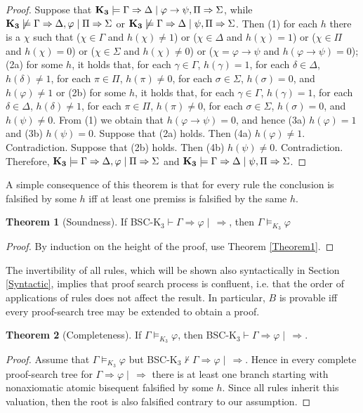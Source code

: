 \documentclass[11pt,a4paper,titlepage]{article}
\theoremstyle{definition}
\newtheorem{theorem}{\textbf{Theorem}}
\newcommand{\3}{\vspace{.3in}}
\newcommand{\2}{\vspace{.2in}}
\newcommand{\1}{\vspace{.1in}}
\newcommand{\5}{\vspace{.05in}}
\begin{document}
\begin{proof}
Suppose that ${\bf K_3}\models\Gamma\Rightarrow\Delta \mid \varphi\rightarrow\psi,\Pi\Rightarrow\Sigma$, while ${\bf K_3}\not\models\Gamma\Rightarrow\Delta,\varphi \mid \Pi\Rightarrow\Sigma$ or ${\bf K_3}\not\models\Gamma\Rightarrow\Delta \mid \psi,\Pi\Rightarrow\Sigma$. Then (1) for each $ h $ there is a $ \chi $ such that ($ \chi\in\Gamma $ and $ h(\chi)\not=1 $) or ($ \chi\in\Delta $ and $ h(\chi)=1 $) or ($ \chi\in\Pi $ and $ h(\chi)=0$) or ($ \chi\in\Sigma $ and $ h(\chi)\not=0 $) or ($ \chi=\varphi\rightarrow\psi $ and $ h(\varphi\rightarrow\psi)=0 $); (2a) for some $ h $, it holds that, for each $ \gamma\in\Gamma $, $h(\gamma)=1$, for each $ \delta\in\Delta $, $ h(\delta)\not=1 $, for each $ \pi\in\Pi $, $ h(\pi)\not=0 $, for each $ \sigma\in\Sigma $, $ h(\sigma)=0 $, and $ h(\varphi)\not=1 $ or (2b) for some $ h $, it holds that, for each $ \gamma\in\Gamma $, $h(\gamma)=1$, for each $ \delta\in\Delta $, $ h(\delta)\not=1 $, for each $ \pi\in\Pi $, $ h(\pi)\not=0 $, for each $ \sigma\in\Sigma $, $ h(\sigma)=0 $, and $ h(\psi)\not=0 $. From (1) we obtain that $ h(\varphi\rightarrow\psi)=0 $, and hence (3a) $ h(\varphi)=1 $ and (3b) $ h(\psi)=0 $. Suppose that (2a) holds. Then (4a) $ h(\varphi)\not=1 $. Contradiction. Suppose that (2b) holds. Then (4b) $ h(\psi)\not=0 $. Contradiction. Therefore, ${\bf K_3}\models\Gamma\Rightarrow\Delta,\varphi \mid \Pi\Rightarrow\Sigma$ and ${\bf K_3}\models\Gamma\Rightarrow\Delta \mid \psi,\Pi\Rightarrow\Sigma$.
\end{proof}


A simple consequence of this theorem is that for every rule the conclusion is falsified by some $h$ iff at least one premiss is falsified by the same $h$.

\begin{theorem}[Soundness]
	If BSC-K$_3 \vdash \Gamma\Rightarrow\varphi\mid\,\Rightarrow$, then $\Gamma\models_{K_3}\varphi$
\end{theorem}
\begin{proof}
By induction on the height of the proof, use Theorem \ref{Theorem1}.
\end{proof}

The invertibility of all rules, which will be shown also syntactically in Section \ref{Syntactic}, implies that proof search process is confluent, i.e. that the order of applications of rules does not affect the result. In particular, $B$ is provable iff every proof-search tree may be extended to obtain a proof.


\begin{theorem}[Completeness]
	If $\Gamma\models_{K_3}\varphi$, then
	BSC-K$_3 \vdash \Gamma\Rightarrow\varphi\mid\,\Rightarrow$.
\end{theorem}
\begin{proof}
	Assume that $\Gamma\models_{K_3}\varphi$ but BSC-K$_3 \nvdash \Gamma\Rightarrow\varphi \mid\,\Rightarrow$. Hence in every complete proof-search tree for $\Gamma\Rightarrow\varphi \mid\,\Rightarrow$ there is at least one branch starting with nonaxiomatic atomic bisequent falsified by some $h$. Since all rules inherit this valuation, then the root is also falsified contrary to our assumption.
\end{proof}
\end{document}
